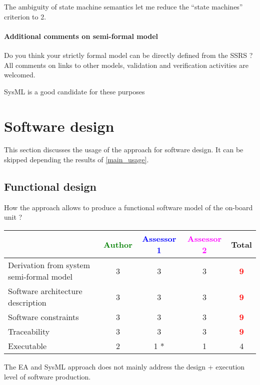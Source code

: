 \begin{assessor1}
The ambiguity of state machine semantics let me reduce the "`state machines"' criterion to 2. 
\end{assessor1}


\paragraph{Additional comments on semi-formal  model} Do you think your strictly formal  model can be directly defined from the SSRS ?
All comments on links to  other models, validation and verification activities are welcomed.

\begin{author_comment}
SysML is a good candidate for these purposes
\end{author_comment}
\section{Software design}
This section discusses the usage of the approach for software design.
It can be skipped depending the results of \ref{main_usage}.

\subsection{Functional design}

How the approach allows to  produce a functional software model of the on-board unit ?

\begin{tabular}{|l | c | c | c | c|}
\hline
& \textcolor{green}{Author} & \textcolor{blue}{Assessor 1} & \textcolor{magenta}{Assessor 2} & Total \\
\hline
Derivation from system semi-formal model  &3 & 3   & 3   & \textcolor{red}{\textbf{9}} \\
\hline 
Software architecture description  &3 & 3   & 3   & \textcolor{red}{\textbf{9}} \\
\hline
Software constraints  &3 & 3   & 3   & \textcolor{red}{\textbf{9}} \\
\hline
Traceability  &3 & 3   &3 & \textcolor{red}{\textbf{9}} \\
\hline
Executable  &2 & 1   *& 1   & 4    \\
\hline
\end{tabular}

\begin{assessor1}
The EA and SysML approach does not mainly address the design + execution level of software production. 
\end{assessor1}

